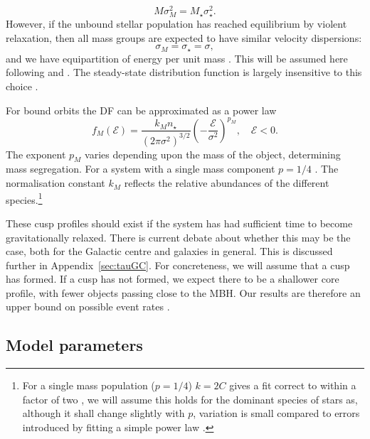 \documentclass[useAMS,usedcolumn,usegraphicx,usenatbib]{mn2e}
\newcommand{\apref}[1]{Appendix~\ref{sec:#1}}
\begin{document}
\begin{equation}
M \sigma_M^2 = M_\star \sigma_\star^2.
\end{equation}
However, if the unbound stellar population has reached equilibrium by violent relaxation, then all mass groups are expected to have similar velocity dispersions:
\begin{equation}
\sigma_M = \sigma_\star = \sigma,
\end{equation}
and we have equipartition of energy per unit mass \citep{Lynden-Bell1967}. This will be assumed here following \citet{Alexander2009} and \citet{O'Leary2009}. The steady-state distribution function is largely insensitive to this choice \citep{Bahcall1977, Alexander2009}.

For bound orbits the DF can be approximated as a power law \citep{Peebles1972}
\begin{equation}
f_M(\mathcal{E}) = \frac{k_M n_\star}{(2\pi\sigma^2)^{3/2}}\left(-\frac{\mathcal{E}}{\sigma^2}\right)^{p_M},\quad\mathcal{E} < 0.
\label{eq:Bound_DF}
\end{equation}
The exponent $p_M$ varies depending upon the mass of the object, determining mass segregation. For a system with a single mass component $p = 1/4$ \citep{Bahcall1976, Young1977}. The normalisation constant $k_M$ reflects the relative abundances of the different species.\footnote{For a single mass population ($p = 1/4$) $k = 2 C$ gives a fit correct to within a factor of two \citep{Bahcall1976,Keshet2009}, we will assume this holds for the dominant species of stars as, although it shall change slightly with $p$, variation is small compared to errors introduced by fitting a simple power law \citep{Hopman2006, Alexander2009}.}

These cusp profiles should exist if the system has had sufficient time to become gravitationally relaxed. There is current debate about whether this may be the case, both for the Galactic centre and galaxies in general. This is discussed further in \apref{tauGC}. For concreteness, we will assume that a cusp has formed. If a cusp has not formed, we expect there to be a shallower core profile, with fewer objects passing close to the MBH. Our results are therefore an upper bound on possible event rates \citep{Merritt2010a,Gualandris2012}. 

\subsection{Model parameters}\label{sec:GC-Param}
\end{document}
